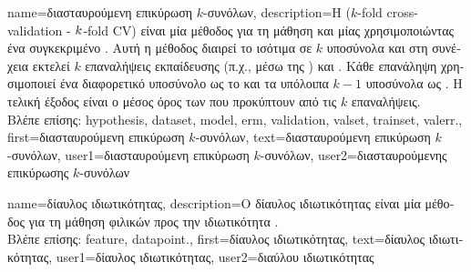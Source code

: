 {name={\foreignlanguage{greek}{διασταυρούμενη επικύρωση $k$-συνόλων}},
	description={\foreignlanguage{greek}{Η} 
		($k$-fold cross-validation - $k$-fold CV) 
		\foreignlanguage{greek}{είναι μία μέθοδος για τη μάθηση και}  
		\foreignlanguage{greek}{μίας}   
		\foreignlanguage{greek}{χρησιμοποιώντας ένα συγκεκριμένο} . 
		\foreignlanguage{greek}{Αυτή η μέθοδος 
		διαιρεί το}  \foreignlanguage{greek}{ισότιμα σε $k$ υποσύνολα 
		και στη συνέχεια εκτελεί $k$ επαναλήψεις εκπαίδευσης}  
		\foreignlanguage{greek}{(π.χ., μέσω της} ) \foreignlanguage{greek}{και} . 
		\foreignlanguage{greek}{Κάθε επανάληψη χρησιμοποιεί ένα διαφορετικό υποσύνολο ως το}  
		\foreignlanguage{greek}{και τα υπόλοιπα $k-1$ υποσύνολα ως} . 
		\foreignlanguage{greek}{Η τελική έξοδος είναι ο μέσος όρος των}  
		\foreignlanguage{greek}{που προκύπτουν από τις $k$ επαναλήψεις.\\
		Βλέπε επίσης:} \gls{hypothesis}, \gls{dataset}, \gls{model}, \gls{erm}, \gls{validation}, \gls{valset}, \gls{trainset}, \gls{valerr}.},
		first={\foreignlanguage{greek}{διασταυρούμενη επικύρωση $k$-συνόλων}},
		text={\foreignlanguage{greek}{διασταυρούμενη επικύρωση $k$-συνόλων}}, 
		user1={\foreignlanguage{greek}{διασταυρούμενη επικύρωση $k$-συνόλων}}, %
		user2={\foreignlanguage{greek}{διασταυρούμενης επικύρωσης $k$-συνόλων}} %
}

{name={\foreignlanguage{greek}{δίαυλος ιδιωτικότητας}},
 description={\foreignlanguage{greek}{Ο δίαυλος ιδιωτικότητας} \foreignlanguage{greek}{είναι μία μέθοδος 
 	για τη μάθηση φιλικών προς την ιδιωτικότητα}   \cite{PrivacyFunnel}.\\
	\foreignlanguage{greek}{Βλέπε επίσης:} \gls{feature}, \gls{datapoint}.},
 first={\foreignlanguage{greek}{δίαυλος ιδιωτικότητας}},
 text={\foreignlanguage{greek}{δίαυλος ιδιωτικότητας}},
 user1={\foreignlanguage{greek}{δίαυλος ιδιωτικότητας}}, %
 user2={\foreignlanguage{greek}{διαύλου ιδιωτικότητας}} %
}

